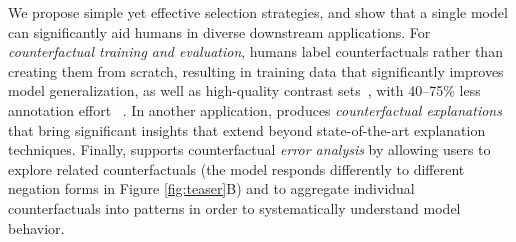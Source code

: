 We propose simple yet effective selection strategies, and show that a single \sysname model can significantly aid humans in diverse downstream applications. For \emph{counterfactual training and evaluation}, humans label \sysname counterfactuals rather than creating them from scratch, resulting in training data that significantly improves model generalization, as well as high-quality contrast sets~\cite{gardner2020contrast}, with 40--75\% less annotation effort ~\cite{kaushik2019learning}. In another application, \sysname produces \emph{counterfactual explanations} that bring significant insights that extend beyond state-of-the-art explanation techniques. Finally, \sysname supports counterfactual \emph{error analysis} by allowing users to explore related counterfactuals (\eg the model responds differently to different negation forms in Figure \ref{fig:teaser}B) and to aggregate individual counterfactuals into patterns in order to systematically understand model behavior.





